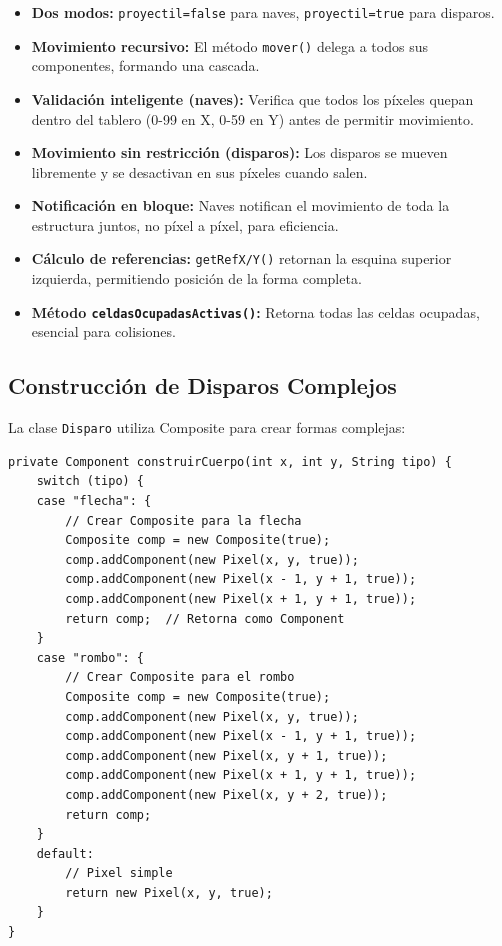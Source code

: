 \documentclass[12pt]{article}
\begin{document}
\begin{itemize}
    \item \textbf{Dos modos:} \texttt{proyectil=false} para naves, \texttt{proyectil=true} para disparos.
    
    \item \textbf{Movimiento recursivo:} El método \texttt{mover()} delega a todos sus componentes, formando una cascada.
    
    \item \textbf{Validación inteligente (naves):} Verifica que todos los píxeles quepan dentro del tablero (0-99 en X, 0-59 en Y) antes de permitir movimiento.
    
    \item \textbf{Movimiento sin restricción (disparos):} Los disparos se mueven libremente y se desactivan en sus píxeles cuando salen.
    
    \item \textbf{Notificación en bloque:} Naves notifican el movimiento de toda la estructura juntos, no píxel a píxel, para eficiencia.
    
    \item \textbf{Cálculo de referencias:} \texttt{getRefX/Y()} retornan la esquina superior izquierda, permitiendo posición de la forma completa.
    
    \item \textbf{Método \texttt{celdasOcupadasActivas()}:} Retorna todas las celdas ocupadas, esencial para colisiones.
\end{itemize}

\subsection{Construcción de Disparos Complejos}

La clase \texttt{Disparo} utiliza Composite para crear formas complejas:

\begin{lstlisting}
private Component construirCuerpo(int x, int y, String tipo) {
    switch (tipo) {
    case "flecha": {
        // Crear Composite para la flecha
        Composite comp = new Composite(true);
        comp.addComponent(new Pixel(x, y, true));
        comp.addComponent(new Pixel(x - 1, y + 1, true));
        comp.addComponent(new Pixel(x + 1, y + 1, true));
        return comp;  // Retorna como Component
    }
    case "rombo": {
        // Crear Composite para el rombo
        Composite comp = new Composite(true);
        comp.addComponent(new Pixel(x, y, true));
        comp.addComponent(new Pixel(x - 1, y + 1, true));
        comp.addComponent(new Pixel(x, y + 1, true));
        comp.addComponent(new Pixel(x + 1, y + 1, true));
        comp.addComponent(new Pixel(x, y + 2, true));
        return comp;
    }
    default:
        // Pixel simple
        return new Pixel(x, y, true);
    }
}
\end{lstlisting}
\end{document}
